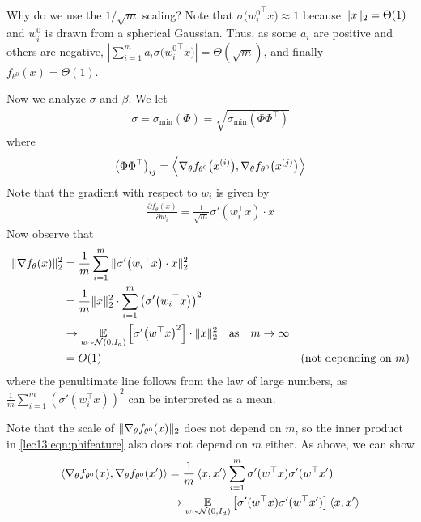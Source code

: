 \begin{enumerate}
    Why do we use the $1/\sqrt{m}$ scaling? Note that $\sigma\big({w_i^0}^\top x\big) \approx 1$ because $\|x\|_2 = \Theta(1)$ and $w_i^0$ is drawn from a spherical Gaussian. Thus, as some $a_i$ are positive and others are negative, $\left|\sum_{i=1}^m a_i \sigma \big({w_i^0}^\top x\big) \right| = \Theta \left( \sqrt{m} \right)$, and finally $f_{\theta^0} (x) = \Theta(1)$. 
    
    Now we analyze $\sigma$ and $\beta$. We let
    \begin{align}
        \sigma = \sigma_{\min} (\Phi) = \sqrt{\sigma_{\min} \left( \Phi \Phi^\top \right)}
    \end{align}
    where 
    \begin{align}
        \left( \Phi \Phi^\top \right)_{ij} = \left\langle\nabla_\theta f_{\theta^0} \big(x^{(i)} \big) , \nabla_\theta f_{\theta^0} \big(x^{(j)} \big)\right\rangle \label{lec13:eqn:phifeature} 
    \end{align} 
    Note that the gradient with respect to $w_i$ is given by 
    \begin{align}  
        \frac{\partial f_\theta(x) }{\partial w_i} = \frac{1}{\sqrt{m}} \sigma'(w_i^\top x ) \cdot x 
    \end{align} 
    Now observe that
    \begin{align}
        \|\nabla f_\theta(x)\|_2^2 & = \frac{1}{m}\sum_{i=1}^m \|\sigma'\big({w_i}^\top x \big) \cdot x \|_2^2 \\ 
        & = \frac{1}{m}\|x\|_2^2 \cdot \sum_{i=1}^m \left( \sigma' \big({w_i}^\top x \big) \right)^2 \\ 
        &\to \operatorname*{\mathbb{E}}_{w \sim \mathcal N(0,I_d)} \left[ \sigma' \big( w^\top x \big)^2 \right] \cdot \|x\|_2^2 \quad \text{as} \quad m\to\infty \\ 
        &= O(1) &\text{(not depending on $m$)}
    \end{align} 
    where the penultimate line follows from the law of large numbers, as $\frac{1}{m} \sum_{i=1}^m \left( \sigma'(w_i^\top x ) \right)^2$ can be interpreted as a mean. 
    
    Note that the scale of $\|\nabla_\theta f_{\theta^0} (x)\|_2$ does not depend on $m$, so the inner product in \eqref{lec13:eqn:phifeature} also does not depend on $m$ either. As above, we can show 
    \begin{align} 
        \left\langle\nabla_\theta f_{\theta^0} (x), \nabla_\theta f_{\theta^0} (x')\right\rangle & = \frac{1}{m}\left\langle x,x'\right\rangle \sum_{i=1}^m \sigma'(w^\top x) \sigma'(w^\top x')  \\ 
        & \to \operatorname*{\mathbb{E}}_{w \sim \mathcal N(0,I_d)} \left[ \sigma'(w^\top x) \sigma'(w^\top x') \right] \left\langle x, x'\right\rangle \label{lec13:eqn:kernelcalc} 
    \end{align}
    

\end{enumerate}

